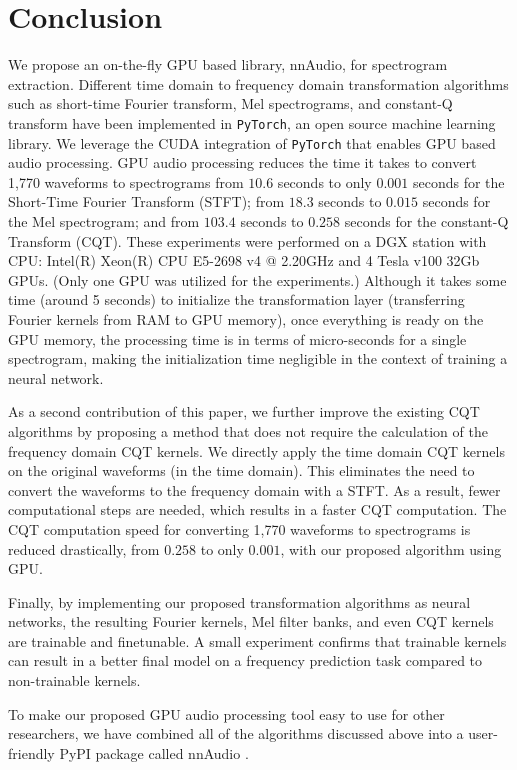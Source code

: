 \documentclass{ieeeaccess}
\newcommand{\nbh}[1]{\texttt{#1}}
\begin{document}
\section{Conclusion}
We propose an on-the-fly GPU based library, nnAudio, for spectrogram extraction. Different time domain to frequency domain transformation algorithms such as short-time Fourier transform, Mel spectrograms, and constant-Q transform have been implemented in \nbh{PyTorch}, an open source machine learning library. We leverage the CUDA integration of \nbh{PyTorch} that enables GPU based audio processing. GPU audio processing reduces the time it takes to convert 1,770 waveforms to spectrograms from $10.6$ seconds to only $0.001$ seconds for the Short-Time Fourier Transform (STFT); from $18.3$ seconds to $0.015$ seconds for the Mel spectrogram; and from $103.4$ seconds to $0.258$ seconds for the constant-Q Transform (CQT). These experiments were performed on a DGX station with CPU: Intel(R) Xeon(R) CPU E5-2698 v4 @ 2.20GHz and 4 Tesla v100 32Gb GPUs. (Only one GPU was utilized for the experiments.) Although it takes some time (around 5 seconds) to initialize the transformation layer (transferring Fourier kernels from RAM to GPU memory), once everything is ready on the GPU memory, the processing time is in terms of micro-seconds for a single spectrogram, making the initialization time negligible in the context of training a neural network. 

As a second contribution of this paper, we further improve the existing CQT algorithms by proposing a method that does not require the calculation of the frequency domain CQT kernels. We directly apply the time domain CQT kernels on the original waveforms (in the time domain). This eliminates the need to convert the waveforms to the frequency domain with a STFT. As a result, fewer computational steps are needed, which results in a faster CQT computation. The CQT computation speed for converting 1,770 waveforms to spectrograms is reduced drastically, from $0.258$ to only $0.001$, with our proposed algorithm using GPU.

Finally, by implementing our proposed transformation algorithms as neural networks, the resulting Fourier kernels, Mel filter banks, and even CQT kernels are trainable and finetunable. A small experiment confirms that trainable kernels can result in a better final model on a frequency prediction task compared to non-trainable kernels. 

To make our proposed GPU audio processing tool easy to use for other researchers, we have combined all of the algorithms discussed above into a user-friendly PyPI package called nnAudio \footnotemark[\ref{nnAudio}].
\end{document}
